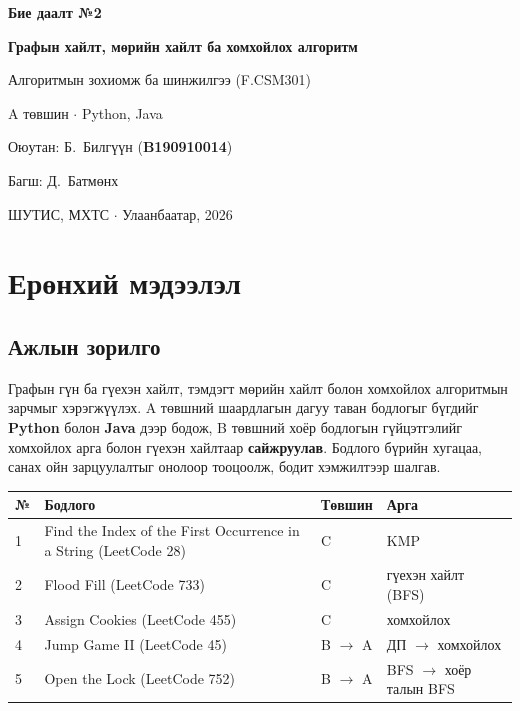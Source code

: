 \documentclass[11pt,a4paper]{article}
\renewcommand{\_}{\oldunderscore\allowbreak}
\begin{document}
\begin{titlepage}
\centering
\vspace*{35mm}
{\LARGE\bfseries Бие даалт №2\par}
\vspace{4mm}
{\Large\bfseries Графын хайлт, мөрийн хайлт ба хомхойлох алгоритм\par}
\vspace{12mm}
{\large Алгоритмын зохиомж ба шинжилгээ (F.CSM301)\par}
\vspace{6mm}
{\large A төвшин $\cdot$ Python, Java\par}
\vfill
{\large Оюутан: Б.~Билгүүн (\textbf{B190910014})\par}
\vspace{3mm}
{\large Багш: Д.~Батмөнх\par}
\vspace{20mm}
ШУТИС, МХТС $\cdot$ Улаанбаатар, 2026\par
\end{titlepage}

\tableofcontents
\clearpage

\section{Ерөнхий мэдээлэл}

\subsection{Ажлын зорилго}
Графын гүн ба гүехэн хайлт, тэмдэгт мөрийн хайлт болон хомхойлох алгоритмын зарчмыг хэрэгжүүлэх. A төвшний шаардлагын дагуу таван бодлогыг бүгдийг \textbf{Python} болон \textbf{Java} дээр бодож, B төвшний хоёр бодлогын гүйцэтгэлийг хомхойлох арга болон гүехэн хайлтаар \textbf{сайжруулав}. Бодлого бүрийн хугацаа, санах ойн зарцуулалтыг онолоор тооцоолж, бодит хэмжилтээр шалгав.

\begin{center}
\small
\begin{tabularx}{\linewidth}{l>{\raggedright\arraybackslash}Xll}
\toprule
\textbf{№} & \textbf{Бодлого} & \textbf{Төвшин} & \textbf{Арга} \\
\midrule
1 & Find the Index of the First Occurrence in a String (LeetCode 28) & C & KMP \\
2 & Flood Fill (LeetCode 733) & C & гүехэн хайлт (BFS) \\
3 & Assign Cookies (LeetCode 455) & C & хомхойлох \\
4 & Jump Game II (LeetCode 45) & B $\rightarrow$ A & ДП $\rightarrow$ хомхойлох \\
5 & Open the Lock (LeetCode 752) & B $\rightarrow$ A & BFS $\rightarrow$ хоёр талын BFS \\
\bottomrule
\end{tabularx}
\end{center}
\end{document}
